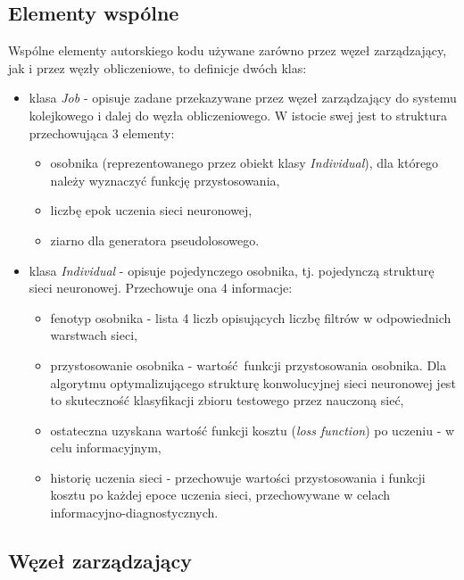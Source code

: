 \subsection{Elementy wspólne}
Wspólne elementy autorskiego kodu używane zarówno przez węzeł zarządzający, jak i przez węzły obliczeniowe, to definicje dwóch klas:
\begin{itemize}
  \item klasa \textit{Job} - opisuje zadane przekazywane przez węzeł zarządzający do systemu kolejkowego i dalej do węzła obliczeniowego.
        W istocie swej jest to struktura przechowująca 3 elementy:
        \begin{itemize}
          \item osobnika (reprezentowanego przez obiekt klasy \textit{Individual}), dla którego należy wyznaczyć funkcję przystosowania,
          \item liczbę epok uczenia sieci neuronowej,
          \item ziarno dla generatora pseudolosowego.
        \end{itemize}
  \item klasa \textit{Individual} - opisuje pojedynczego osobnika, tj. pojedynczą strukturę sieci neuronowej.
        Przechowuje ona 4 informacje:
        \begin{itemize}
          \item fenotyp osobnika - lista 4 liczb opisujących liczbę filtrów w odpowiednich warstwach sieci,
          \item przystosowanie osobnika - wartość funkcji przystosowania osobnika.
                Dla algorytmu optymalizującego strukturę konwolucyjnej sieci neuronowej jest to skuteczność klasyfikacji zbioru testowego przez nauczoną sieć,
          \item ostateczna uzyskana wartość funkcji kosztu (\textit{loss function}) po uczeniu - w celu informacyjnym,
          \item historię uczenia sieci - przechowuje wartości przystosowania i funkcji kosztu po każdej epoce uczenia sieci, przechowywane w celach informacyjno-diagnostycznych.
        \end{itemize}
\end{itemize}


\subsection{Węzeł zarządzający}


